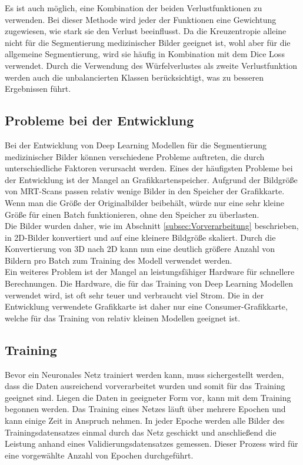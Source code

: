 Es ist auch möglich, eine Kombination der beiden Verlustfunktionen zu verwenden. Bei dieser Methode wird jeder der Funktionen eine Gewichtung zugewiesen, wie stark sie den Verlust beeinflusst. Da die Kreuzentropie alleine nicht für die Segmentierung medizinischer Bilder geeignet ist, wohl aber für die allgemeine Segmentierung, wird sie häufig in Kombination mit dem Dice Loss verwendet. Durch die Verwendung des Würfelverlustes als zweite Verlustfunktion werden auch die unbalancierten Klassen berücksichtigt, was zu besseren Ergebnissen führt. \cite[vgl.][]{Jadon2020}

\subsection{Probleme bei der Entwicklung}
Bei der Entwicklung von Deep Learning \gls{Modell}en für die Segmentierung medizinischer Bilder können verschiedene Probleme auftreten, die durch unterschiedliche Faktoren verursacht werden. Eines der häufigsten Probleme bei der Entwicklung ist der Mangel an Grafikkartenspeicher. Aufgrund der Bildgröße von \ac{MRT}-Scans passen relativ wenige Bilder in den Speicher der Grafikkarte. Wenn man die Größe der Originalbilder beibehält, würde nur eine sehr kleine Größe für einen Batch funktionieren, ohne den Speicher zu überlasten. \\
Die Bilder wurden daher, wie im Abschnitt \ref{subsec:Vorverarbeitung} beschrieben, in 2D-Bilder konvertiert und auf eine kleinere Bildgröße skaliert. Durch die Konvertierung von 3D nach 2D kann nun eine deutlich größere Anzahl von Bildern pro Batch zum Training des \gls{Modell} verwendet werden.\\
Ein weiteres Problem ist der Mangel an leistungsfähiger Hardware für schnellere Berechnungen. Die Hardware, die für das Training von Deep Learning \gls{Modell}en verwendet wird, ist oft sehr teuer und verbraucht viel Strom. Die in der Entwicklung verwendete Grafikkarte ist daher nur eine Consumer-Grafikkarte, welche für das Training von relativ kleinen \gls{Modell}en geeignet ist.

\subsection{Training}
Bevor ein Neuronales Netz trainiert werden kann, muss sichergestellt werden, dass die Daten ausreichend vorverarbeitet wurden und somit für das Training geeignet sind. Liegen die Daten in geeigneter Form vor, kann mit dem Training begonnen werden. Das Training eines Netzes läuft über mehrere Epochen und kann einige Zeit in Anspruch nehmen. In jeder Epoche werden alle Bilder des Trainingsdatensatzes einmal durch das Netz geschickt und anschließend die Leistung anhand eines Validierungsdatensatzes gemessen. Dieser Prozess wird für eine vorgewählte Anzahl von Epochen durchgeführt.

